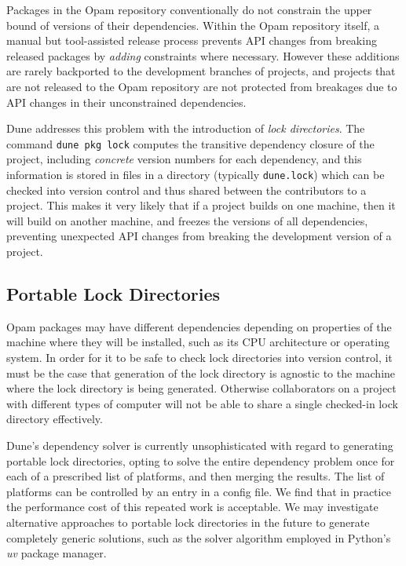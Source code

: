 \documentclass{article}
\begin{document}
\begin{multicols}{2}
        Packages in the Opam repository conventionally do not constrain the
        upper bound of versions of their dependencies. Within the Opam
        repository itself, a manual but tool-assisted release process prevents
        API changes from breaking released packages by \textit{adding}
        constraints where necessary. However these additions are rarely
        backported to the development branches of projects, and projects that
        are not released to the Opam repository are not protected from breakages
        due to API changes in their unconstrained dependencies.

        Dune addresses this problem with the introduction of \textit{lock
        directories}. The command \texttt{dune pkg lock} computes the transitive
        dependency closure of the project, including \textit{concrete} version
        numbers for each dependency, and this information is stored in files in
        a directory (typically \texttt{dune.lock}) which can be checked into
        version control and thus shared between the contributors to a project.
        This makes it very likely that if a project builds on one machine, then
        it will build on another machine, and freezes the versions of all
        dependencies, preventing unexpected API changes from breaking the
        development version of a project.

        \subsection {Portable Lock Directories}

        Opam packages may have different dependencies depending on properties of
        the machine where they will be installed, such as its CPU architecture
        or operating system. In order for it to be safe to check lock
        directories into version control, it must be the case that generation of
        the lock directory is agnostic to the machine where the lock directory
        is being generated. Otherwise collaborators on a project with different
        types of computer will not be able to share a single checked-in lock
        directory effectively.

        Dune's dependency solver is currently unsophisticated with regard to
        generating portable lock directories, opting to solve the entire
        dependency problem once for each of a prescribed list of platforms, and
        then merging the results. The list of platforms can be controlled by an
        entry in a config file. We find that in practice the performance cost of
        this repeated work is acceptable. We may investigate alternative
        approaches to portable lock directories in the future to
        generate completely generic solutions, such as the solver algorithm
        employed in Python's \textit{uv} package manager.


\end{multicols}
\end{document}

